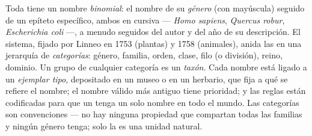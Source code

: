 \begin{definition}\label{def:b1:classifying-biodiversity:nomenclature}
Toda  tiene un nombre \emph{binomial}: el nombre de su
\emph{género} (con mayúscula) seguido de un epíteto específico, ambos en
cursiva --- \emph{Homo sapiens}, \emph{Quercus robur},
\emph{Escherichia coli} ---, a menudo seguidos del autor y del año de su
descripción. El sistema, fijado por Linneo en 1753 (plantas) y
1758 (animales), anida las  en una jerarquía de \emph{categorías}:
género, familia, orden, clase, filo (o división), reino, dominio. Un grupo
de cualquier categoría es un \emph{taxón}. Cada nombre está ligado a un
\emph{ejemplar tipo}, depositado en un museo o en un herbario, que fija a
qué se refiere el nombre; el nombre válido más antiguo tiene prioridad; y
las reglas están codificadas para que un  tenga un solo nombre en
todo el mundo. Las categorías son convenciones --- no hay ninguna propiedad
que compartan todas las familias y ningún género tenga; solo la  es
una unidad natural.
\end{definition}

